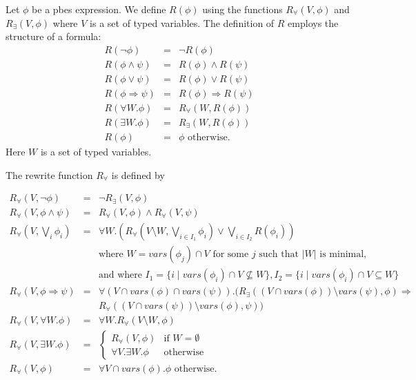 \documentclass{article}
\newcommand{\vars}{\mathit{vars}}
\begin{document}
Let $\phi$ be a pbes expression. We
define $R(\phi)$ using the functions $R_{\forall}(V,\phi)$ and
$R_{\exists}(V,\phi)$ where $V$ is a set of typed variables. The
definition of $R$ employs the structure of a formula:
\begin{equation*}
\begin{array}{lll}
R(\neg \phi)&=&\neg R(\phi)\\
R(\phi\wedge \psi)&=&R(\phi)\wedge R(\psi)\\
R(\phi\vee\psi)&=&R(\phi)\vee R(\psi)\\
R(\phi\Rightarrow\psi)&=&R(\phi)\Rightarrow R(\psi)\\
R(\forall W.\phi)&=&R_{\forall}(W,R(\phi))\\
R(\exists W.\phi)&=&R_{\exists}(W,R(\phi))\\
R(\phi)&=&\phi\textrm{  otherwise}.
\end{array}
\end{equation*}
Here $W$ is a set of typed variables.

The rewrite function $R_{\forall}$ is defined by

\begin{equation*}
\begin{array}{lll}
R_{\forall}(V,\neg \phi) &=& \neg R_{\exists}(V,\phi)\\

R_{\forall}(V,\phi\wedge \psi)&=&R_{\forall}(V,\phi)\wedge R_{\forall}(V,\psi)\\

R_{\forall}(V, \bigvee_i \phi_i)&=&
  \forall W.
    \left(
         R_\forall(V \setminus W, \bigvee_{i \in I_1}\phi_i) \lor \bigvee_{i \in I_2}R(\phi_i)
    \right) \\
  && \text{where } W = \vars(\phi_j) \cap V \text{ for some $j$ such that $|W|$ is minimal,} \\
  && \text{and where } I_1 = \{ i \mid \vars(\phi_i) \cap V \nsubseteq W \}, I_2 = \{ i \mid \vars(\phi_i) \cap V \subseteq W \} \\

R_{\forall}(V,\phi\Rightarrow\psi)&=&\forall (V\cap\vars(\phi)\cap\vars(\psi)).
(R_{\exists}((V\cap \vars(\phi))\setminus \vars(\psi),\phi)\Rightarrow{} \\
&& R_{\forall}((V\cap\vars(\psi))\setminus\vars(\phi),\psi))\\

R_{\forall}(V,\forall W.\phi)&=&\forall W.R_{\forall}(V\setminus W,\phi)\\

R_{\forall}(V,\exists W.\phi)&=&
\left\{\begin{array}{ll}
R_{\forall}(V,\phi)&\textrm{if }W=\emptyset\\
\forall V.\exists W.\phi&\textrm{otherwise}
\end{array}\right.\\

R_{\forall}(V,\phi)&=&\forall V\cap \vars(\phi).\phi\textrm{ otherwise}.

\end{array}
\end{equation*}
\end{document}
